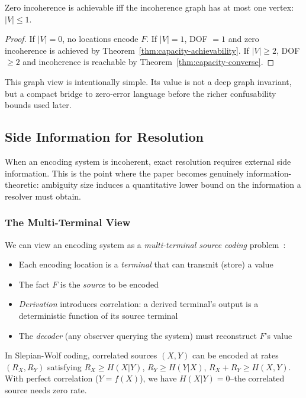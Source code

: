 \begin{theorem}\label{thm:incoherence-graph}
Zero incoherence is achievable iff the incoherence graph has at most one vertex: $|V| \leq 1$.
\end{theorem}

\begin{proof}
If $|V| = 0$, no locations encode $F$. If $|V| = 1$, DOF $= 1$ and zero incoherence is achieved by Theorem~\ref{thm:capacity-achievability}. If $|V| \geq 2$, DOF $\geq 2$ and incoherence is reachable by Theorem~\ref{thm:capacity-converse}.
\end{proof}

This graph view is intentionally simple. Its value is not a deep graph invariant, but a compact bridge to zero-error language before the richer confusability bounds used later.

\subsection{Side Information for Resolution}\label{sec:side-information}

When an encoding system is incoherent, exact resolution requires external side information. This is the point where the paper becomes genuinely information-theoretic: ambiguity size induces a quantitative lower bound on the information a resolver must obtain.

\subsubsection{The Multi-Terminal View}

We can view an encoding system as a \emph{multi-terminal source coding} problem~\cite{slepian1973noiseless,cover2006elements}:
\begin{itemize}
\tightlist
\item Each encoding location is a \emph{terminal} that can transmit (store) a value
\item The fact $F$ is the \emph{source} to be encoded
\item \emph{Derivation} introduces correlation: a derived terminal's output is a deterministic function of its source terminal
\item The \emph{decoder} (any observer querying the system) must reconstruct $F$'s value
\end{itemize}

In Slepian-Wolf coding, correlated sources $(X, Y)$ can be encoded at rates $(R_X, R_Y)$ satisfying $R_X \geq H(X|Y)$, $R_Y \geq H(Y|X)$, $R_X + R_Y \geq H(X,Y)$. With perfect correlation ($Y = f(X)$), we have $H(X|Y) = 0$--the correlated source needs zero rate.

